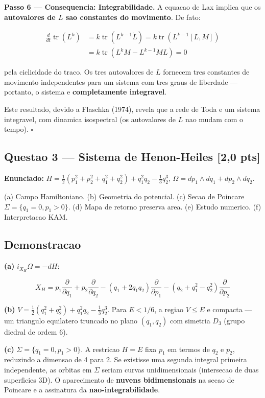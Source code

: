 \documentclass[12pt,a4paper,oneside]{article}
\begin{document}
\textbf{Passo 6 — Consequencia: Integrabilidade.} A equacao de Lax implica
que os \textbf{autovalores de $L$ sao constantes do movimento}. De fato:

\begin{align*}
\frac{d}{dt}\operatorname{tr}(L^k) &= k\operatorname{tr}(L^{k-1}\dot L)
= k\operatorname{tr}(L^{k-1}[L,M]) \\
&= k\operatorname{tr}(L^k M - L^{k-1} M L) = 0
\end{align*}

pela ciclicidade do traco. Os tres autovalores de $L$ fornecem tres
constantes de movimento independentes para um sistema com tres graus de
liberdade — portanto, o sistema e \textbf{completamente integravel}.

Este resultado, devido a Flaschka (1974), revela que a rede de Toda e um
sistema integravel, com dinamica isospectral (os autovalores de $L$ nao
mudam com o tempo). $\square$

\subsection{Questao 3 — Sistema de Henon-Heiles [2,0 pts]}

\textbf{Enunciado:} $H = \frac12(p_1^2+p_2^2+q_1^2+q_2^2) + q_1^2q_2 -
\frac13 q_2^3$, $\Omega = dp_1\wedge dq_1 + dp_2\wedge dq_2$.

(a) Campo Hamiltoniano. (b) Geometria do potencial.
(c) Secao de Poincare $\Sigma = \{q_1=0, p_1>0\}$.
(d) Mapa de retorno preserva area.
(e) Estudo numerico. (f) Interpretacao KAM.

\subsection*{Demonstracao}

\textbf{(a)} $i_{X_H}\Omega = -dH$:

$$X_H = p_1\frac{\partial}{\partial q_1} + p_2\frac{\partial}{\partial q_2}
- (q_1+2q_1q_2)\frac{\partial}{\partial p_1} -
(q_2+q_1^2-q_2^2)\frac{\partial}{\partial p_2}$$

\textbf{(b)} $V = \frac12(q_1^2+q_2^2) + q_1^2q_2 - \frac13 q_2^3$. Para
$E < 1/6$, a regiao $V \leq E$ e compacta — um triangulo equilatero truncado
no plano $(q_1,q_2)$ com simetria $D_3$ (grupo diedral de ordem 6).

\textbf{(c)} $\Sigma = \{q_1=0, p_1>0\}$. A restricao $H=E$ fixa $p_1$ em
termos de $q_2$ e $p_2$, reduzindo a dimensao de 4 para 2. Se existisse uma
segunda integral primeira independente, as orbitas em $\Sigma$ seriam curvas
unidimensionais (intersecao de duas superficies 3D). O aparecimento de
\textbf{nuvens bidimensionais} na secao de Poincare e a assinatura da
\textbf{nao-integrabilidade}.
\end{document}
